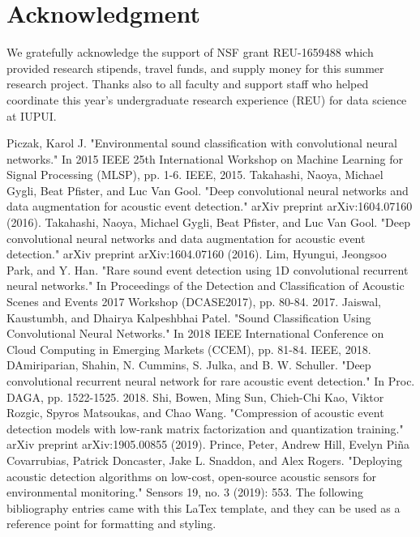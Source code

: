 \documentclass[conference]{IEEEtran}
\begin{document}
\section*{Acknowledgment}

We gratefully acknowledge the support of NSF grant REU-1659488 which provided research stipends, travel funds, and supply money for this summer research project. Thanks also to all faculty and support staff who helped coordinate this year's undergraduate research experience (REU) for data science at IUPUI.

\begin{thebibliography}{00}
 Piczak, Karol J. "Environmental sound classification with convolutional neural networks." In 2015 IEEE 25th International Workshop on Machine Learning for Signal Processing (MLSP), pp. 1-6. IEEE, 2015.
 Takahashi, Naoya, Michael Gygli, Beat Pfister, and Luc Van Gool. "Deep convolutional neural networks and data augmentation for acoustic event detection." arXiv preprint arXiv:1604.07160 (2016).
 Takahashi, Naoya, Michael Gygli, Beat Pfister, and Luc Van Gool. "Deep convolutional neural networks and data augmentation for acoustic event detection." arXiv preprint arXiv:1604.07160 (2016).
 Lim, Hyungui, Jeongsoo Park, and Y. Han. "Rare sound event detection using 1D convolutional recurrent neural networks." In Proceedings of the Detection and Classification of Acoustic Scenes and Events 2017 Workshop (DCASE2017), pp. 80-84. 2017.
 Jaiswal, Kaustumbh, and Dhairya Kalpeshbhai Patel. "Sound Classification Using Convolutional Neural Networks." In 2018 IEEE International Conference on Cloud Computing in Emerging Markets (CCEM), pp. 81-84. IEEE, 2018.
 DAmiriparian, Shahin, N. Cummins, S. Julka, and B. W. Schuller. "Deep convolutional recurrent neural network for rare acoustic event detection." In Proc. DAGA, pp. 1522-1525. 2018.
 Shi, Bowen, Ming Sun, Chieh-Chi Kao, Viktor Rozgic, Spyros Matsoukas, and Chao Wang. "Compression of acoustic event detection models with low-rank matrix factorization and quantization training." arXiv preprint arXiv:1905.00855 (2019).
 Prince, Peter, Andrew Hill, Evelyn Piña Covarrubias, Patrick Doncaster, Jake L. Snaddon, and Alex Rogers. "Deploying acoustic detection algorithms on low-cost, open-source acoustic sensors for environmental monitoring." Sensors 19, no. 3 (2019): 553.
 The following bibliography entries came with this LaTex template, and they can be used as a reference point for formatting and styling.

\end{thebibliography}
\end{document}
